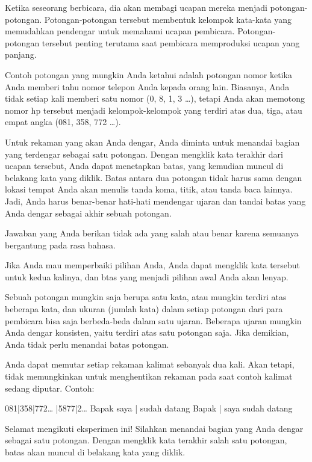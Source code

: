 Ketika seseorang berbicara, dia akan membagi ucapan mereka menjadi potongan-potongan. Potongan-potongan tersebut membentuk kelompok kata-kata yang memudahkan pendengar untuk memahami ucapan pembicara. Potongan-potongan tersebut penting terutama saat pembicara memproduksi ucapan yang panjang. \newline 

Contoh potongan yang mungkin Anda ketahui adalah potongan nomor ketika Anda memberi tahu nomor telepon Anda kepada orang lain. Biasanya, Anda tidak setiap kali memberi satu nomor (0, 8, 1, 3 …), tetapi Anda akan memotong nomor hp tersebut menjadi kelompok-kelompok yang terdiri atas dua, tiga, atau empat angka (081, 358, 772 …). \newline 

Untuk rekaman yang akan Anda dengar, Anda diminta untuk menandai bagian yang terdengar sebagai satu potongan. Dengan mengklik kata terakhir dari ucapan tersebut, Anda dapat menetapkan batas, yang kemudian muncul di belakang kata yang diklik. Batas antara dua potongan tidak harus sama dengan lokasi tempat Anda akan menulis tanda koma, titik, atau tanda baca lainnya. Jadi, Anda harus benar-benar hati-hati mendengar ujaran dan tandai batas yang Anda dengar sebagai akhir sebuah potongan.\newline 

Jawaban yang Anda berikan tidak ada yang salah atau benar karena semuanya bergantung pada rasa bahasa.\newline 

Jika Anda mau memperbaiki pilihan Anda, Anda dapat mengklik kata tersebut untuk kedua kalinya, dan btas yang menjadi pilihan awal Anda akan lenyap.\newline 

Sebuah potongan mungkin saja berupa satu kata, atau mungkin terdiri atas beberapa kata, dan ukuran (jumlah kata) dalam setiap potongan dari para pembicara bisa saja berbeda-beda dalam satu ujaran. Beberapa ujaran mungkin Anda dengar konsisten, yaitu terdiri atas satu potongan saja. Jika demikian, Anda tidak perlu menandai batas potongan.\newline

Anda dapat memutar setiap rekaman kalimat sebanyak dua kali. Akan tetapi, tidak memungkinkan untuk menghentikan rekaman pada saat contoh kalimat sedang diputar.\newline 
Contoh:  
\begin{center}
	
	081|358|772… |5877|2… \newline
	Bapak saya | sudah datang \newline
	Bapak | saya sudah datang \newline
\end{center}
Selamat mengikuti eksperimen ini!\newline
Silahkan menandai bagian yang Anda dengar sebagai satu potongan. 
Dengan mengklik kata terakhir salah satu potongan, batas akan muncul di belakang kata yang diklik.


